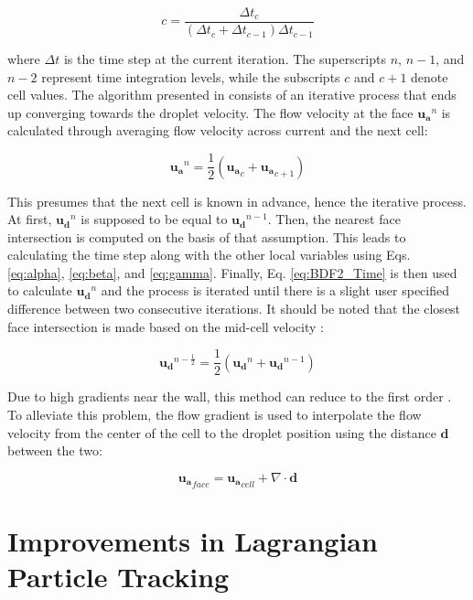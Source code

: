 \begin{equation}
c = \frac{\Delta t_c}{(\Delta t_c+\Delta t_{c-1})\Delta t_{c-1}}
\label{eq:gamma}
\end{equation}

\noindent where $\Delta t$ is the time step at the current iteration. The superscripts $n$, $n-1$, and $n-2$ represent time integration levels, while the subscripts $c$ and $c+1$ denote cell values. The algorithm presented in \cite{rendall2014finite} consists of an iterative process that ends up converging towards the droplet velocity. The flow velocity at the face $\boldsymbol{u_a}^n$ is calculated through averaging flow velocity across current and the next cell: 

\begin{equation}
    \boldsymbol{u_a}^n = \frac{1}{2} (\boldsymbol{u_a}_c + \boldsymbol{u_a}_{c+1})
\end{equation}

\noindent This presumes that the next cell is known in advance, hence the iterative process. At first, $\boldsymbol{u_d}^n$ is supposed to be equal to $\boldsymbol{u_d}^{n-1}$. Then, the nearest face intersection is computed on the basis of that assumption. This leads to calculating the time step along with the other local variables using Eqs. \ref{eq:alpha}, \ref{eq:beta}, and \ref{eq:gamma}. Finally, Eq. \ref{eq:BDF2_Time} is then used to calculate $\boldsymbol{u_d}^n$ and the process is iterated until there is a slight user specified difference between two consecutive iterations. It should be noted that the closest face intersection is made based on the mid-cell velocity :

\begin{equation}
    \boldsymbol{u_d}^{n-\frac{1}{2}} = \frac{1}{2} (\boldsymbol{u_d}^n + \boldsymbol{u_d}^{n-1})
\end{equation}

\noindent Due to high gradients near the wall, this method can reduce to the first order \cite{rendall2014finite}. To alleviate this problem, the flow gradient is used to interpolate the flow velocity from the center of the cell to the droplet position using the distance $\boldsymbol{d}$ between the two: 

\begin{equation}
\boldsymbol{u_a}_{face} = \boldsymbol{u_a}_{cell} + \nabla \cdot \boldsymbol{d}
\label{eq:faceFlow}
\end{equation}

\section{Improvements in Lagrangian Particle Tracking}
\label{sec:solverEnhacements}

